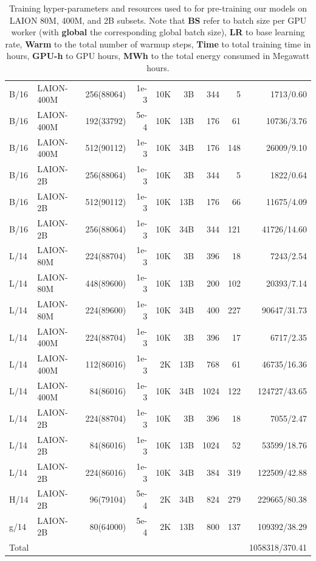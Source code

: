 \begin{appendix}
\begin{table}[ht]
\begin{tabular}{@{}llrrrrrrr@{}}
B/16 & LAION-400M & 256(88064) & 1e-3 & 10K & 3B & 344 & 5 & 1713/0.60 \\
B/16 & LAION-400M & 192(33792) & 5e-4 & 10K & 13B & 176 & 61 & 10736/3.76 \\
B/16 & LAION-400M & 512(90112) & 1e-3 & 10K & 34B & 176 & 148 & 26009/9.10 \\
B/16 & LAION-2B & 256(88064) & 1e-3 & 10K & 3B & 344 & 5 & 1822/0.64 \\
B/16 & LAION-2B & 512(90112) & 1e-3 & 10K & 13B & 176 & 66 & 11675/4.09 \\
B/16 & LAION-2B & 256(88064) & 1e-3 & 10K & 34B & 344 & 121 & 41726/14.60 \\
L/14 & LAION-80M & 224(88704) & 1e-3 & 10K & 3B & 396 & 18 & 7243/2.54 \\
L/14 & LAION-80M & 448(89600) & 1e-3 & 10K & 13B & 200 & 102 & 20393/7.14 \\
L/14 & LAION-80M & 224(89600) & 1e-3 & 10K & 34B & 400 & 227 & 90647/31.73 \\
L/14 & LAION-400M & 224(88704) & 1e-3 & 10K & 3B & 396 & 17 & 6717/2.35 \\
L/14 & LAION-400M & 112(86016) & 1e-3 & 2K & 13B & 768 & 61 & 46735/16.36 \\
L/14 & LAION-400M & 84(86016) & 1e-3 & 10K & 34B & 1024 & 122 & 124727/43.65 \\
L/14 & LAION-2B & 224(88704) & 1e-3 & 10K & 3B & 396 & 18 & 7055/2.47 \\
L/14 & LAION-2B & 84(86016) & 1e-3 & 10K & 13B & 1024 & 52 & 53599/18.76 \\
L/14 & LAION-2B & 224(86016) & 1e-3 & 10K & 34B & 384 & 319 & 122509/42.88 \\
H/14 & LAION-2B & 96(79104) & 5e-4 & 2K & 34B & 824 & 279 & 229665/80.38 \\
g/14 & LAION-2B & 80(64000) & 5e-4 & 2K & 13B & 800 & 137 & 109392/38.29 \\ \midrule
Total &  &  &  &  &  &  &  & 1058318/370.41 \\

\bottomrule
\end{tabular}
\caption{Training hyper-parameters and resources used to for pre-training our models on LAION 80M, 400M, and 2B subsets. Note that \textbf{BS} refer to batch size per GPU worker (with \textbf{global} the corresponding global batch size), \textbf{LR}  to base learning rate, \textbf{Warm} to the total number of warmup steps, \textbf{Time} to total training time in hours, \textbf{GPU-h} to GPU hours, \textbf{MWh} to the total energy consumed in Megawatt hours.}
\label{table:openclip_hyper_parameters}
\end{table}



\end{appendix}

